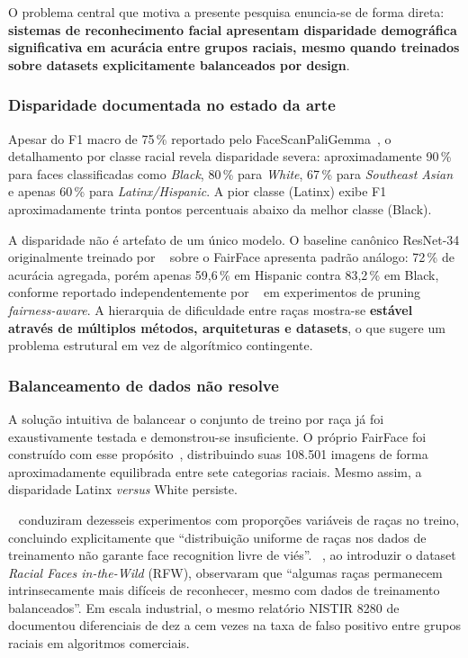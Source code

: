 O problema central que motiva a presente pesquisa enuncia-se de forma direta: \textbf{sistemas de reconhecimento facial apresentam disparidade demográfica significativa em acurácia entre grupos raciais, mesmo quando treinados sobre datasets explicitamente balanceados por design}.

\subsubsection{Disparidade documentada no estado da arte}
\label{sec:problema_disparidade}

Apesar do F1 macro de 75\,\% reportado pelo FaceScanPaliGemma~\autocite{aldahoul2024exploring}, o detalhamento por classe racial revela disparidade severa: aproximadamente 90\,\% para faces classificadas como \emph{Black}, 80\,\% para \emph{White}, 67\,\% para \emph{Southeast Asian} e apenas 60\,\% para \emph{Latinx/Hispanic}. A pior classe (Latinx) exibe F1 aproximadamente trinta pontos percentuais abaixo da melhor classe (Black).

A disparidade não é artefato de um único modelo. O baseline canônico ResNet-34 originalmente treinado por \citeauthor{karkkainen2021fairface}~\autocite{karkkainen2021fairface} sobre o FairFace apresenta padrão análogo: 72\,\% de acurácia agregada, porém apenas 59,6\,\% em Hispanic contra 83,2\,\% em Black, conforme reportado independentemente por \citeauthor{lin2022fairgrape}~\autocite{lin2022fairgrape} em experimentos de pruning \emph{fairness-aware}. A hierarquia de dificuldade entre raças mostra-se \textbf{estável através de múltiplos métodos, arquiteturas e datasets}, o que sugere um problema estrutural em vez de algorítmico contingente.

\subsubsection{Balanceamento de dados não resolve}
\label{sec:problema_balanceamento}

A solução intuitiva de balancear o conjunto de treino por raça já foi exaustivamente testada e demonstrou-se insuficiente. O próprio FairFace foi construído com esse propósito~\autocite{karkkainen2021fairface}, distribuindo suas 108.501 imagens de forma aproximadamente equilibrada entre sete categorias raciais. Mesmo assim, a disparidade Latinx \emph{versus} White persiste.

\citeauthor{kolla2022impact}~\autocite{kolla2022impact} conduziram dezesseis experimentos com proporções variáveis de raças no treino, concluindo explicitamente que ``distribuição uniforme de raças nos dados de treinamento não garante face recognition livre de viés''. \citeauthor{wang2019racial}~\autocite{wang2019racial}, ao introduzir o dataset \emph{Racial Faces in-the-Wild} (RFW), observaram que ``algumas raças permanecem intrinsecamente mais difíceis de reconhecer, mesmo com dados de treinamento balanceados''. Em escala industrial, o mesmo relatório NISTIR 8280 de \citeauthor{grother2019face}~\autocite{grother2019face} documentou diferenciais de dez a cem vezes na taxa de falso positivo entre grupos raciais em algoritmos comerciais.

